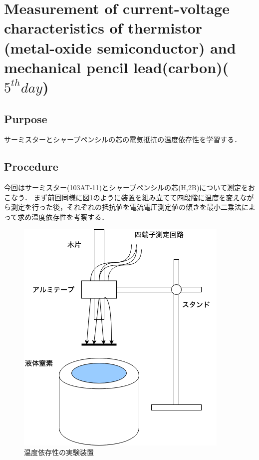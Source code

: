 \documentclass[11pt, a4paper,twocolumn]{jarticle}
\begin{document}
\section{Measurement of current-voltage characteristics of thermistor (metal-oxide semiconductor) and mechanical pencil lead(carbon)($5^{th} day$)}

\subsection{Purpose}
サーミスターとシャープペンシルの芯の電気抵抗の温度依存性を学習する．
\subsection{Procedure}
今回はサーミスター(103AT-11)とシャープペンシルの芯(H,2B)について測定をおこなう．
まず前回同様に図\ref{fig:29}のように装置を組み立てて四段階に温度を変えながら測定を行った後，それぞれの抵抗値を電流電圧測定値の傾きを最小二乗法によって求め温度依存性を考察する．

\begin{figure}[htbp]
 \begin{center}
  \includegraphics[width=0.8\linewidth]{fig29.png}
 \end{center}
 \caption{温度依存性の実験装置}
 \label{fig:29}
\end{figure}
\end{document}
